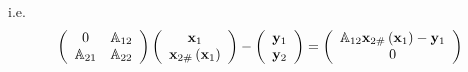 \documentclass[aps,preprint]{revtex4}%
\begin{document}
i.e.%
\begin{equation}
\left(
\begin{array}
[c]{cc}%
0 & \mathbb{A}_{12}\\
\mathbb{A}_{21} & \mathbb{A}_{22}%
\end{array}
\right)  \left(
\begin{array}
[c]{c}%
\mathbf{x}_{1}\\
\mathbf{x}_{2\#}\left(  \mathbf{x}_{1}\right)
\end{array}
\right)  -\left(
\begin{array}
[c]{c}%
\mathbf{y}_{1}\\
\mathbf{y}_{2}%
\end{array}
\right)  =\left(
\begin{array}
[c]{c}%
\mathbb{A}_{12}\mathbf{x}_{2\#}\left(  \mathbf{x}_{1}\right)  -\mathbf{y}%
_{1}\\
0
\end{array}
\right)
\end{equation}
\end{document}
